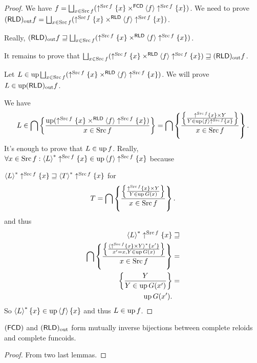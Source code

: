 \begin{proof}
We have $f=\bigsqcup_{x\in\Src f}(\uparrow^{\Src f}\{x\}\times^{\mathsf{FCD}}\supfun f\uparrow^{\Src f}\{x\})$.
We need to prove $\torldout f=\bigsqcup_{x\in\Src f}(\uparrow^{\Src f}\{x\}\times^{\mathsf{RLD}}\supfun f\uparrow^{\Src f}\{x\})$.

Really, $\torldout f\sqsupseteq\bigsqcup_{x\in\Src f}(\uparrow^{\Src f}\{x\}\times^{\mathsf{RLD}}\supfun f\uparrow^{\Src f}\{x\})$.

It remains to prove that $\bigsqcup_{x\in\Src f}(\uparrow^{\Src f}\{x\}\times^{\mathsf{RLD}}\supfun f\uparrow^{\Src f}\{x\})\sqsupseteq\torldout f$.

Let $L\in\up\bigsqcup_{x\in\Src f}(\uparrow^{\Src f}\{x\}\times^{\mathsf{RLD}}\supfun f\uparrow^{\Src f}\{x\})$.
We will prove $L\in\up\torldout f$.

We have 
\[
L\in\bigcap\setcond{\up(\uparrow^{\Src f}\{x\}\times^{\mathsf{RLD}}\supfun f\uparrow^{\Src f}\{x\})}{x\in\Src f}=\bigcap\setcond{\setcond{\uparrow^{\Src f}\{x\}\times Y}{Y\in\up\supfun f\uparrow^{\Src f}\{x\}}}{x\in\Src f}.
\]
It's enough to prove that $L\in\up f$. Really, $\forall x\in\Src f:\rsupfun L\uparrow^{\Src f}\{x\}\in\up\supfun f\uparrow^{\Src f}\{x\}$
because

$\rsupfun L\uparrow^{\Src f}\{x\}\sqsupseteq\rsupfun T\uparrow^{\Src f}\{x\}$
for 
\[
T=\bigcap\setcond{\setcond{\uparrow^{\Src f}\{x\}\times Y}{Y\in\up G(x)}}{x\in\Src f}.
\]
and thus 
\begin{eqnarray*}
\rsupfun L\uparrow^{\Src f}\{x\} & \sqsupseteq\\
\bigcap\setcond{\setcond{\langle\uparrow^{\Src f}\{x\}\times Y\rangle^{\ast}\{x'\}}{x'=x,Y\in\up G(x)}}{x\in\Src f} & =\\
\setcond Y{Y\in\up G(x')} & =\\
\up G(x').
\end{eqnarray*}
So $\rsupfun L\{x\}\in\up\supfun f\{x\}$ and thus $L\in\up f$.\end{proof}
\begin{prop}
$\tofcd$ and $\torldout$ form mutually inverse bijections between
complete reloids and complete funcoids.\end{prop}
\begin{proof}
From two last lemmas.\end{proof}
